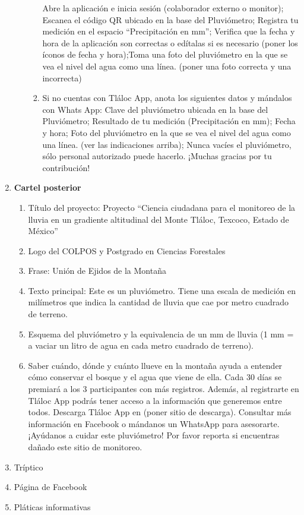 \begin{enumerate}
\begin{enumerate}
\begin{enumerate}
            Abre la aplicación e inicia sesión (colaborador externo o monitor); Escanea el código QR ubicado en la base del Pluviómetro; Registra tu medición en el espacio “Precipitación en mm”; Verifica que la fecha  y hora de la aplicación son correctas o edítalas si es necesario (poner los íconos de fecha y hora);Toma una foto del pluviómetro en la que se vea el nivel del agua como una línea. (poner una foto correcta y una incorrecta)            
            \item 	Si no cuentas con Tláloc App, anota los siguientes datos y mándalos con Whats App: Clave del pluviómetro ubicada en la base del Pluviómetro; Resultado de tu medición (Precipitación en mm); Fecha y hora; Foto del pluviómetro en la que se vea el nivel del agua como una línea. (ver las indicaciones arriba); Nunca vacíes el pluviómetro, sólo personal autorizado puede hacerlo. ¡Muchas gracias por tu contribución!            
        \end{enumerate}
    \end{enumerate}
    \item \textbf{Cartel posterior} \begin{enumerate}
        \item Título del proyecto: Proyecto “Ciencia ciudadana para el monitoreo de la lluvia en un gradiente altitudinal del Monte Tláloc, Texcoco, Estado de México”
        \item Logo del COLPOS y Postgrado en Ciencias Forestales
        \item Frase: Unión de Ejidos de la Montaña
        \item Texto principal: Este es un pluviómetro. Tiene una escala de medición en milímetros que indica la cantidad de lluvia que cae por metro cuadrado de terreno.
        \item Esquema del pluviómetro y la equivalencia de un mm de lluvia (1 mm = a vaciar un litro de agua en cada metro cuadrado de terreno).
        \item Saber cuándo, dónde y cuánto llueve en la montaña ayuda a entender cómo conservar el bosque y el agua que viene de ella. Cada 30 días se premiará a los 3 participantes con más registros. Además, al registrarte en Tláloc App podrás tener acceso a la información que generemos entre todos. Descarga Tláloc App en (poner sitio de descarga). Consultar más información en Facebook o mándanos un WhatsApp para asesorarte. ¡Ayúdanos a cuidar este pluviómetro! Por favor reporta si encuentras dañado este sitio de monitoreo.
    \end{enumerate}
    \item Tríptico
    \item Página de Facebook
    \item Pláticas informativas
\end{enumerate}
